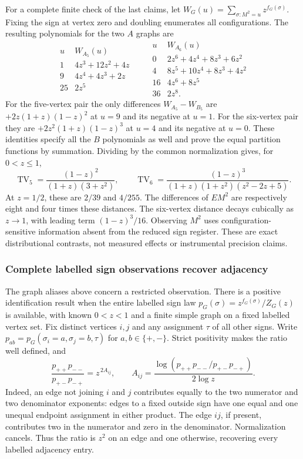 For a complete finite check of the last claims, let
\(W_G(u)=\sum_{\sigma:M^2=u}z^{f_G(\sigma)}\).
Fixing the sign at vertex zero and doubling enumerates all
configurations.  The resulting polynomials for the two \(A\) graphs are
\[
\begin{array}{c|l}
u&W_{A_5}(u)\\ \hline
1&4z^3+12z^2+4z\\
9&4z^4+4z^3+2z\\
25&2z^5
\end{array}
\qquad
\begin{array}{c|l}
u&W_{A_6}(u)\\ \hline
0&2z^6+4z^4+8z^3+6z^2\\
4&8z^5+10z^4+8z^3+4z^2\\
16&4z^6+8z^5\\
36&2z^8 .
\end{array}
\]
For the five-vertex pair the only differences \(W_{A_5}-W_{B_5}\)
are \(+2z(1+z)(1-z)^2\) at \(u=9\) and its negative at \(u=1\).
For the six-vertex pair they are \(+2z^2(1+z)(1-z)^3\) at \(u=4\)
and its negative at \(u=0\).
These identities specify all the \(B\) polynomials as well and prove
the equal partition functions by summation.  Dividing by the common
normalization gives, for \(0<z\le1\),
\[
 \operatorname{TV}_5=
 \frac{(1-z)^2}{(1+z)(3+z^2)},\qquad
 \operatorname{TV}_6=
 \frac{(1-z)^3}{(1+z)(1+z^2)(z^2-2z+5)}.
\]
At \(z=1/2\), these are \(2/39\) and \(4/255\).
The differences of \(E M^2\) are respectively eight and four times
these distances.  The six-vertex distance decays cubically as \(z\to1\),
with leading term \((1-z)^3/16\).
Observing \(M^2\) uses configuration-sensitive information absent from
the reduced sign register.  These are exact distributional contrasts,
not measured effects or instrumental precision claims.

\subsubsection{Complete labelled sign observations recover adjacency}
\label{fin:labelled-sign-recovery}

The graph aliases above concern a restricted observation.  There is a
positive identification result when the entire labelled sign law
\(p_G(\sigma)=z^{f_G(\sigma)}/Z_G(z)\) is available, with known
\(0<z<1\) and a finite simple graph on a fixed labelled vertex set.
Fix distinct vertices \(i,j\) and any assignment \(\tau\) of all other
signs.  Write \(p_{ab}=p_G(\sigma_i=a,\sigma_j=b,\tau)\) for
\(a,b\in\{+,-\}\).  Strict positivity makes the ratio well defined, and
\[
 \frac{p_{++}p_{--}}{p_{+-}p_{-+}}
       =z^{\,2A_{ij}},\qquad
 A_{ij}=\frac{\log(p_{++}p_{--}/p_{+-}p_{-+})}{2\log z}.
\]
Indeed, an edge not joining \(i\) and \(j\) contributes equally to the
two numerator and two denominator exponents: edges to a fixed outside
sign have one equal and one unequal endpoint assignment in either
product.  The edge \(ij\), if present, contributes two in the numerator
and zero in the denominator.  Normalization cancels.  Thus the ratio
is \(z^2\) on an edge and one otherwise, recovering every labelled
adjacency entry.

